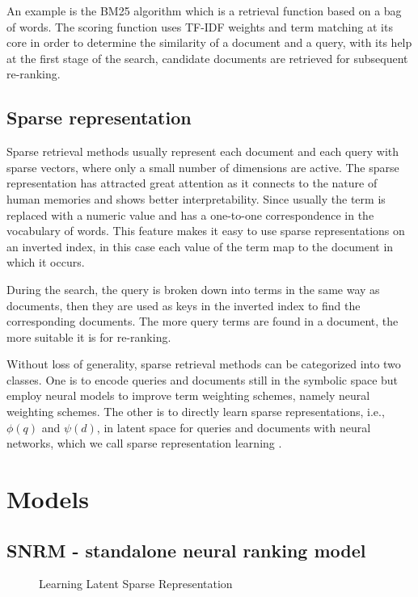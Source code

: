 \documentclass[
    twocolumn,
]{ceurart}
\begin{document}
    An example is the BM25 \cite{bm25} algorithm which is a retrieval function based on a bag of
    words.
    The scoring function uses TF-IDF weights and term matching at its core in order to
    determine the similarity of a document and a query, with its help at the first stage of
    the search, candidate documents are retrieved for subsequent re-ranking.

    \subsection{Sparse representation}

    Sparse retrieval methods usually represent each document and each query with sparse vectors,
    where only a small number of dimensions are active.
    The sparse representation has attracted great attention as it connects to the nature of human
    memories and shows better interpretability.
    Since usually the term is replaced with a numeric value and has a one-to-one correspondence
    in the vocabulary of words.
    This feature makes it easy to use sparse representations on an inverted index, in this case
    each value of the term map to the document in which it occurs.

    During the search, the query is broken down into terms in the same way as documents, then
    they are used as keys in the inverted index to find the corresponding documents.
    The more query terms are found in a document, the more suitable it is for re-ranking.

    Without loss of generality, sparse retrieval methods can be categorized into two classes.
    One is to encode queries and documents still in the symbolic space but employ neural models
    to improve term weighting schemes, namely neural weighting schemes.
    The other is to directly learn sparse representations, i.e., $\phi(q)$ and $\psi(d)$, in
    latent space for queries and documents with neural networks, which we call sparse
    representation learning \cite{SOTA}.


    \section{Models}

    \subsection{SNRM - standalone neural ranking model}

    \begin{figure}[h]
        \centering
        \def\svgwidth{\columnwidth}
        
        \caption{Learning Latent Sparse Representation}
    \end{figure}
\end{document}

